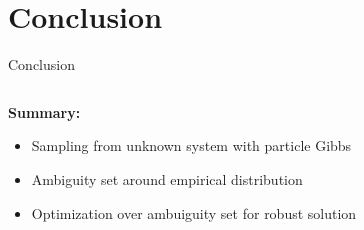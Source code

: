 \documentclass[student, noshadow, itr, english, aspectratio=169]{ITR_LSR_slides}
\begin{document}
\section{Conclusion}

\begin{frame}{Conclusion}
	\begin{columns}[onlytextwidth, T]
		\begin{column}{.6\textwidth}
			\textbf{Summary:}
		
			\begin{itemize}
				\item Sampling from unknown system with particle Gibbs
				\item Ambiguity set around empirical distribution
				\item Optimization over ambuiguity set for robust solution
			\end{itemize}
		

\end{column}
\end{columns}
\end{frame}
\end{document}
